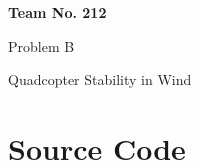 \documentclass[12pt]{article}
\begin{document}
\thispagestyle{empty}

\begin{center}
{\bf\large{Team No. 212}}

\vspace{1em}

{\large{Problem B}}


\vspace{4em}
{\Large{Quadcopter Stability in Wind}}
\end{center}

\vspace{5em}


\newpage

\tableofcontents
\newpage











\newpage
\appendix
\section{Source Code}

\begin{framed}

\end{framed}
\end{document}
